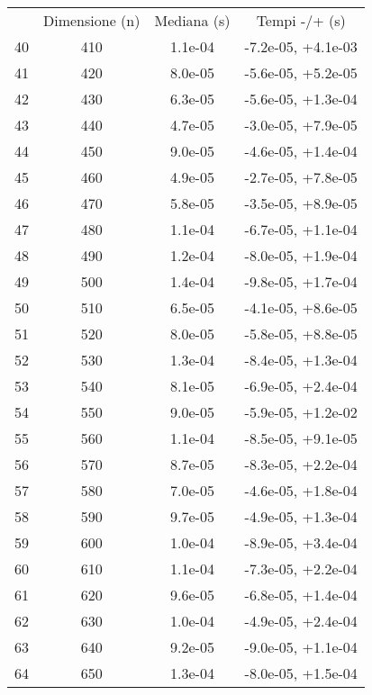 \begin{table}
\centering
\begin{adjustbox}{width=1\textwidth/2}
\begin{tabular}{|c|c|c|c|}
\hline
 & Dimensione (n) & Mediana (s) & Tempi -/+ (s) \\
40 & 410 & 1.1e-04 & -7.2e-05, +4.1e-03 \\
\cline{1-4}
41 & 420 & 8.0e-05 & -5.6e-05, +5.2e-05 \\
\cline{1-4}
42 & 430 & 6.3e-05 & -5.6e-05, +1.3e-04 \\
\cline{1-4}
43 & 440 & 4.7e-05 & -3.0e-05, +7.9e-05 \\
\cline{1-4}
44 & 450 & 9.0e-05 & -4.6e-05, +1.4e-04 \\
\cline{1-4}
45 & 460 & 4.9e-05 & -2.7e-05, +7.8e-05 \\
\cline{1-4}
46 & 470 & 5.8e-05 & -3.5e-05, +8.9e-05 \\
\cline{1-4}
47 & 480 & 1.1e-04 & -6.7e-05, +1.1e-04 \\
\cline{1-4}
48 & 490 & 1.2e-04 & -8.0e-05, +1.9e-04 \\
\cline{1-4}
49 & 500 & 1.4e-04 & -9.8e-05, +1.7e-04 \\
\cline{1-4}
50 & 510 & 6.5e-05 & -4.1e-05, +8.6e-05 \\
\cline{1-4}
51 & 520 & 8.0e-05 & -5.8e-05, +8.8e-05 \\
\cline{1-4}
52 & 530 & 1.3e-04 & -8.4e-05, +1.3e-04 \\
\cline{1-4}
53 & 540 & 8.1e-05 & -6.9e-05, +2.4e-04 \\
\cline{1-4}
54 & 550 & 9.0e-05 & -5.9e-05, +1.2e-02 \\
\cline{1-4}
55 & 560 & 1.1e-04 & -8.5e-05, +9.1e-05 \\
\cline{1-4}
56 & 570 & 8.7e-05 & -8.3e-05, +2.2e-04 \\
\cline{1-4}
57 & 580 & 7.0e-05 & -4.6e-05, +1.8e-04 \\
\cline{1-4}
58 & 590 & 9.7e-05 & -4.9e-05, +1.3e-04 \\
\cline{1-4}
59 & 600 & 1.0e-04 & -8.9e-05, +3.4e-04 \\
\cline{1-4}
60 & 610 & 1.1e-04 & -7.3e-05, +2.2e-04 \\
\cline{1-4}
61 & 620 & 9.6e-05 & -6.8e-05, +1.4e-04 \\
\cline{1-4}
62 & 630 & 1.0e-04 & -4.9e-05, +2.4e-04 \\
\cline{1-4}
63 & 640 & 9.2e-05 & -9.0e-05, +1.1e-04 \\
\cline{1-4}
64 & 650 & 1.3e-04 & -8.0e-05, +1.5e-04 \\

\end{tabular}
\end{adjustbox}
\end{table}
